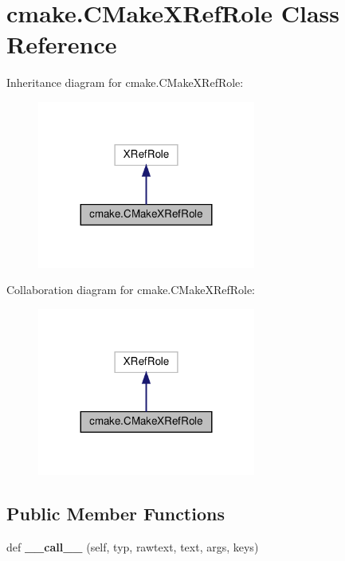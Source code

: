 \hypertarget{classcmake_1_1CMakeXRefRole}{}\section{cmake.\+C\+Make\+X\+Ref\+Role Class Reference}
\label{classcmake_1_1CMakeXRefRole}


Inheritance diagram for cmake.\+C\+Make\+X\+Ref\+Role\+:
\nopagebreak
\begin{figure}[H]
\begin{center}
\leavevmode
\includegraphics[width=203pt]{classcmake_1_1CMakeXRefRole__inherit__graph}
\end{center}
\end{figure}


Collaboration diagram for cmake.\+C\+Make\+X\+Ref\+Role\+:
\nopagebreak
\begin{figure}[H]
\begin{center}
\leavevmode
\includegraphics[width=203pt]{classcmake_1_1CMakeXRefRole__coll__graph}
\end{center}
\end{figure}
\subsection*{Public Member Functions}
\begin{DoxyCompactItemize}
\item 
\mbox{\label{classcmake_1_1CMakeXRefRole_ac1902f080ef5f30ca8ab71515d6e0024}} 
def {\bfseries \+\_\+\+\_\+call\+\_\+\+\_\+} (self, typ, rawtext, text, args, keys)
\end{DoxyCompactItemize}
